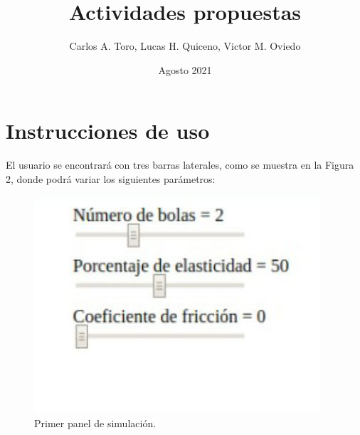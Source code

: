 \documentclass{article}
\title{Actividades propuestas}
\author{Carlos A. Toro, Lucas H. Quiceno, Victor M. Oviedo}
\date{Agosto 2021}
\begin{document}
\maketitle

\section{Instrucciones de uso}

El usuario se encontrará con tres barras laterales, como se muestra en la Figura 2, donde podrá variar los siguientes parámetros:
\begin{figure}[h]
\includegraphics[width=\linewidth]{lab1.jpeg}
\caption{Primer panel de simulación.}
\end{figure}
\end{document}
